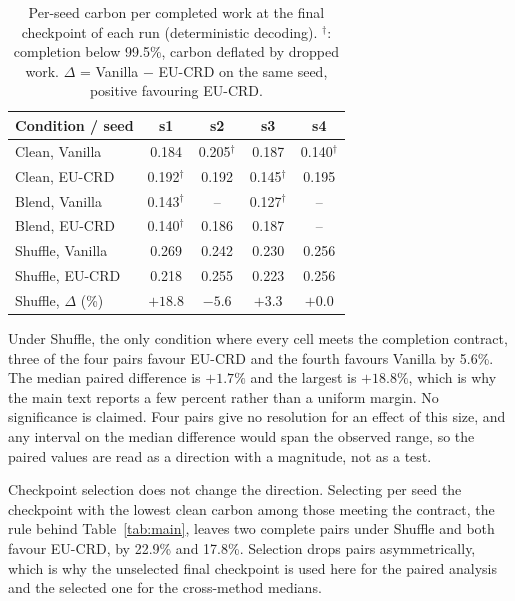 \documentclass{article} %
\begin{document}
\begin{table}[ht]
\caption{Per-seed carbon per completed work at the final checkpoint of each run (deterministic decoding). $^{\dagger}$: completion below 99.5\%, carbon deflated by dropped work. $\Delta$ = Vanilla $-$ EU-CRD on the same seed, positive favouring EU-CRD.}
\label{tab:perseed}
\centering
\small
\begin{tabular*}{\linewidth}{@{\extracolsep{\fill}}lcccc@{}}
\toprule
Condition / seed & s1 & s2 & s3 & s4 \\
\midrule
Clean, Vanilla   & 0.184 & 0.205$^{\dagger}$ & 0.187 & 0.140$^{\dagger}$ \\
Clean, EU-CRD    & 0.192$^{\dagger}$ & 0.192 & 0.145$^{\dagger}$ & 0.195 \\
\addlinespace
Blend, Vanilla   & 0.143$^{\dagger}$ & -- & 0.127$^{\dagger}$ & -- \\
Blend, EU-CRD    & 0.140$^{\dagger}$ & 0.186 & 0.187 & -- \\
\addlinespace
Shuffle, Vanilla & 0.269 & 0.242 & 0.230 & 0.256 \\
Shuffle, EU-CRD  & 0.218 & 0.255 & 0.223 & 0.256 \\
Shuffle, $\Delta$ (\%) & $+18.8$ & $-5.6$ & $+3.3$ & $+0.0$ \\
\bottomrule
\end{tabular*}
\end{table}

Under Shuffle, the only condition where every cell meets the completion contract, three of the four pairs favour EU-CRD and the fourth favours Vanilla by 5.6\%. The median paired difference is $+1.7\%$ and the largest is $+18.8\%$, which is why the main text reports a few percent rather than a uniform margin. No significance is claimed. Four pairs give no resolution for an effect of this size, and any interval on the median difference would span the observed range, so the paired values are read as a direction with a magnitude, not as a test.

Checkpoint selection does not change the direction. Selecting per seed the checkpoint with the lowest clean carbon among those meeting the contract, the rule behind Table~\ref{tab:main}, leaves two complete pairs under Shuffle and both favour EU-CRD, by 22.9\% and 17.8\%. Selection drops pairs asymmetrically, which is why the unselected final checkpoint is used here for the paired analysis and the selected one for the cross-method medians.

\end{document}
